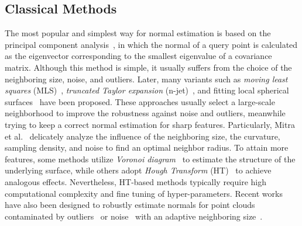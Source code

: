\documentclass[runningheads]{llncs}
\begin{document}
\subsection{Classical Methods}
The most popular and simplest way for normal estimation is based on the principal component analysis~\cite{hoppe1992surface}, in which the normal of a query point is calculated as the eigenvector corresponding to the smallest eigenvalue of a covariance matrix. Although this method is simple, it usually suffers from the choice of the neighboring size, noise, and outliers. Later, many variants such as \textit{moving least squares} (MLS)~\cite{levin1998approximation}, \emph{truncated Taylor expansion} (n-jet)~\cite{cazals2005estimating}, and fitting local spherical surfaces~\cite{guennebaud2007algebraic} have been proposed. These approaches usually select a large-scale neighborhood to improve the robustness against noise and outliers, meanwhile trying to keep a correct normal estimation for sharp features.
Particularly, Mitra et al.~\cite{mitra2003estimating} delicately analyze the influence of the neighboring size, the curvature, sampling density, and noise to find an optimal neighbor radius. To attain more features, some methods utilize 
\emph{Voronoi diagram}~\cite{alliez2007voronoi,amenta1999surface,dey2006provable,merigot2010voronoi} to estimate the structure of the underlying surface, while others adopt {\em Hough Transform} (HT)~\cite{boulch2012fast} to achieve analogous effects. Nevertheless, HT-based methods typically 
require high computational complexity and fine tuning of hyper-parameters. {Recent works have also been designed to robustly estimate normals for point clouds contaminated by outliers~\cite{nurunnabi2015outlier,khaloo2017robust} or noise~\cite{giraudot2013noise} with an  adaptive neighboring size~\cite{comino2018sensor,nurunnabi2014robust,castillo2013point}}.
\end{document}
